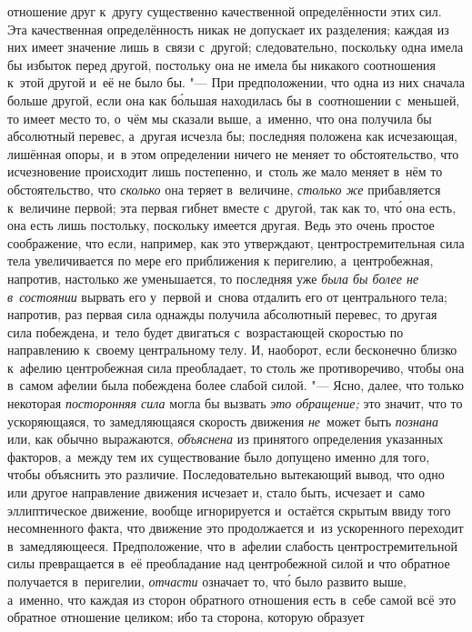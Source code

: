 отношение друг к~другу существенно качественной определённости этих сил. Эта
качественная определённость никак не допускает их разделения; каждая из них
имеет значение лишь в~связи с~другой; следовательно, поскольку одна имела бы
избыток перед другой, постольку она не имела бы никакого соотношения к~этой
другой и~её не было бы. "--- При предположении, что одна из них сначала больше
другой, если она как б\'{о}льшая находилась бы в~соотношении с~меньшей, то
имеет место то, о~чём мы сказали выше, а~именно, что она получила бы абсолютный
перевес, а~другая исчезла бы; последняя положена как исчезающая, лишённая
опоры, и~в этом определении ничего не меняет то обстоятельство, что
исчезновение происходит лишь постепенно, и~столь же мало меняет в~нём то
обстоятельство, что {\em сколько} она теряет в~величине, {\em столько же}
прибавляется к~величине первой; эта первая гибнет вместе с~другой, так как то,
чт\'{о} она есть, она есть лишь постольку, поскольку имеется другая. Ведь это
очень простое соображение, что если, например, как это утверждают,
центростремительная сила тела увеличивается по мере его приближения к
перигелию, а~центробежная, напротив, настолько же уменьшается, то последняя уже
{\em была бы более не в~состоянии} вырвать его у~первой и~снова отдалить его от
центрального тела; напротив, раз первая сила однажды получила абсолютный
перевес, то другая сила побеждена, и~тело будет двигаться с~возрастающей
скоростью по направлению к~своему центральному телу. И, наоборот, если
бесконечно близко к~афелию центробежная сила преобладает, то столь же
противоречиво, чтобы она в~самом афелии была побеждена более слабой силой. "---
Ясно, далее, что только некоторая {\em посторонняя сила} могла бы вызвать
{\em это обращение;} это значит, что то ускоряющаяся, то замедляющаяся
скорость движения {\em не}~может быть {\em познана} или, как обычно выражаются,
{\em объяснена} из принятого определения
указанных факторов, а~между тем их существование было
допущено именно для того, чтобы объяснить это различие. Последовательно
вытекающий вывод, что одно или другое направление движения исчезает и, стало
быть, исчезает и~само эллиптическое движение, вообще игнорируется и~остаётся
скрытым ввиду того несомненного факта, что движение это продолжается и~из
ускоренного переходит в~замедляющееся. Предположение, что в~афелии слабость
центростремительной силы превращается в~её преобладание над центробежной силой
и что обратное получается в~перигелии, {\em отчасти} означает то, чт\'{о} было
развито выше, а~именно, что каждая из сторон обратного отношения есть в~себе
самой всё это обратное отношение целиком; ибо та сторона, которую образует
